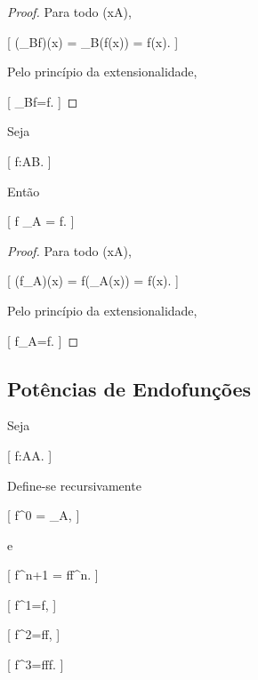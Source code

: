 \documentclass[../../main]{subfiles}
\begin{document}
\begin{proof}

	Para todo (x\in A),

	[
			(_B\circ f)(x)
			=
			_B(f(x))
			=
			f(x).
		]

	Pelo princípio da extensionalidade,

	[
			_B\circ f=f.
		]

\end{proof}

\begin{prop}
	\label{prop:matematica:funcoes:composicao:neutro-direita}

	Seja

		[
			f:A\to B.
		]

	Então

	[
	f
	\circ
	_A
	=
	f.
	]

\end{prop}

\begin{proof}

	Para todo (x\in A),

	[
			(f\circ{}_A)(x)
			=
			f(_A(x))
			=
			f(x).
		]

	Pelo princípio da extensionalidade,

	[
			f\circ{}_A=f.
		]

\end{proof}

\subsection{Potências de Endofunções}

\begin{defn}
	\label{def:matematica:funcoes:composicao:potencia}

	Seja

		[
			f:A\to A.
		]

	Define-se recursivamente

		[
			f^0
			=
			_A,
		]

	e

		[
			f^{n+1}
			=
			f\circ f^n.
		]

\end{defn}

\begin{ex}

	[
		f^1=f,
	]

	[
		f^2=f\circ f,
	]

	[
		f^3=f\circ f\circ f.
	]

\end{ex}
\end{document}
